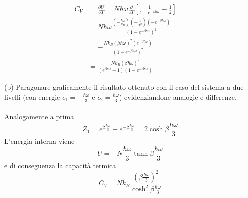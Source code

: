 \documentclass[a4paper]{article}
\begin{document}
        \begin{equation*}
            \begin{split}
                C_V&=\frac{\partial U}{\partial T}=N\hbar\omega\frac{\partial}{\partial T}\left[\frac{1}{1-e^{-\beta\hbar\omega}}-\frac{1}{2}\right]=\\
                &=N\hbar\omega\frac{\left(-\frac{\hbar\omega}{k_B}\right)\left(-\frac{1}{T^2}\right)(-e^{-\beta\hbar\omega})}{(1-e^{-\beta\hbar\omega})^2}=\\
                &=-\frac{Nk_B(\beta\hbar\omega)^2(e^{-\beta\hbar\omega})}{(1-e^{-\beta\hbar\omega})^2}=\\
                &=\frac{Nk_B(\beta\hbar\omega)^2}{(e^{\beta\hbar\omega}-1)(1-e^{-\beta\hbar\omega})}
            \end{split}
        \end{equation*}
        \begin{center}
        \end{center}
        (b) Paragonare graficamente il risultato ottenuto con il caso del sistema a due livelli (con energie $\epsilon_1=-\frac{\hbar\omega}{3}$ e $\epsilon_2=\frac{\hbar\omega}{3}$) evidenziandone analogie e differenze.
        \\
        \\
        Analogamente a prima
        \begin{equation*}
            Z_1=e^{\beta\frac{\hbar\omega}{3}}+e^{-\beta\frac{\hbar\omega}{3}}=2\cosh\beta\frac{\hbar\omega}{3}
        \end{equation*}
        L'energia interna viene
        \begin{equation*}
            U=-N\frac{\hbar\omega}{3}\tanh\beta\frac{\hbar\omega}{3}
        \end{equation*}
        e di conseguenza la capacità termica
        \begin{equation*}
            C_V=Nk_B\frac{\left(\beta\frac{\hbar\omega}{3}\right)^2}{\cosh^2\beta\frac{\hbar\omega}{3}}
        \end{equation*}
\end{document}
